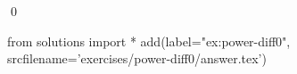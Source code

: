 
\begin{ex} 
  \label{ex:power-diff0}
  
  \qed
\end{ex} 
\begin{python0}
from solutions import *
add(label="ex:power-diff0",
    srcfilename='exercises/power-diff0/answer.tex') 
\end{python0}
